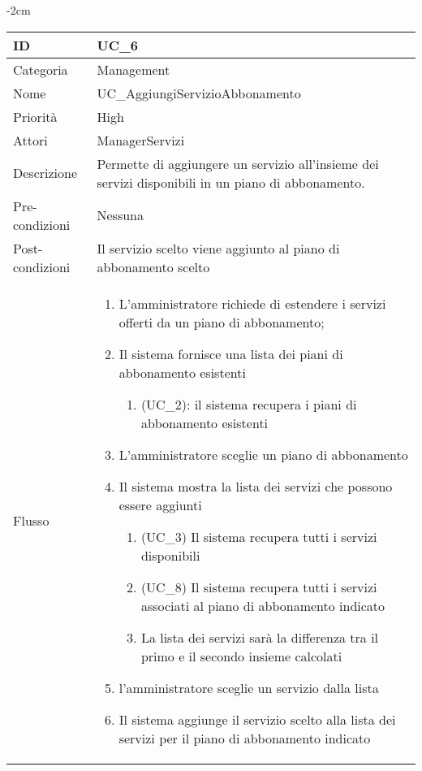 \begin{center}
\begin{table}[bp]
    \centering
    \addtolength{\leftskip} {-2cm}
\begin{tabular}{ |p{2.6cm}|p{13cm}|  }
\hline
ID & UC\_6 \\\hline
Categoria & Management\\\hline
Nome & UC\_AggiungiServizioAbbonamento\\\hline
Priorità & High \\\hline
Attori &  ManagerServizi \\\hline
Descrizione & Permette di aggiungere un servizio all'insieme dei servizi disponibili in un piano di abbonamento.\\\hline
Pre-condizioni & Nessuna \\\hline
Post-condizioni &  Il servizio scelto viene aggiunto al piano di abbonamento scelto \\\hline
Flusso &  	\vspace{-5mm} \begin{enumerate}
		\item L'amministratore richiede di estendere i servizi offerti da un piano di abbonamento;
		\item Il sistema fornisce una lista dei piani di abbonamento esistenti
		\begin{enumerate}[  ]
			\item (UC\_2): il sistema recupera i piani di abbonamento esistenti
		\end{enumerate}
		\item L'amministratore sceglie un piano di abbonamento
		\item Il sistema mostra la lista dei servizi che possono essere aggiunti		
			\begin{enumerate}[label*=\arabic*.]
			\item (UC\_3) Il sistema recupera tutti i servizi disponibili
			\item (UC\_8) Il sistema recupera tutti i servizi associati al piano di abbonamento indicato
			\item La lista dei servizi sarà la differenza tra il primo e il secondo insieme calcolati
			\end{enumerate}
		\item l'amministratore sceglie un servizio dalla lista
		\item Il sistema aggiunge il servizio scelto alla lista dei servizi per il piano di abbonamento indicato
		\end{enumerate}\\\hline
\end{tabular}
\label{table_use_case:6}\newline
\end{table}


\end{center}
